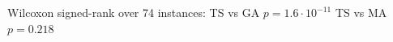 Wilcoxon signed-rank over 74 instances: TS vs GA $p=1.6\cdot10^{-11}$ \textperiodcentered{} TS vs MA $p=0.218$
